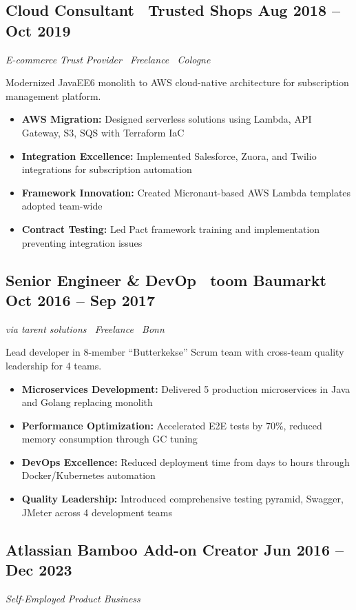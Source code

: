 \documentclass[10pt,a4paper]{article}
\begin{document}
\subsection{Cloud Consultant \textbar\ Trusted Shops \hfill Aug 2018 -- Oct 2019}
\textit{E-commerce Trust Provider \textbar\ Freelance \textbar\ Cologne}

Modernized JavaEE6 monolith to AWS cloud-native architecture for subscription management platform.
\begin{itemize}
\item \textbf{AWS Migration:} Designed serverless solutions using Lambda, API Gateway, S3, SQS with Terraform IaC
\item \textbf{Integration Excellence:} Implemented Salesforce, Zuora, and Twilio integrations for subscription automation
\item \textbf{Framework Innovation:} Created Micronaut-based AWS Lambda templates adopted team-wide
\item \textbf{Contract Testing:} Led Pact framework training and implementation preventing integration issues
\end{itemize}

\vfill

\newpage

\subsection{Senior Engineer \& DevOp \textbar\ toom Baumarkt \hfill Oct 2016 -- Sep 2017}
\textit{via tarent solutions \textbar\ Freelance \textbar\ Bonn}

Lead developer in 8-member ``Butterkekse'' Scrum team with cross-team quality leadership for 4 teams.
\begin{itemize}
\item \textbf{Microservices Development:} Delivered 5 production microservices in Java and Golang replacing monolith
\item \textbf{Performance Optimization:} Accelerated E2E tests by 70\%, reduced memory consumption through GC tuning
\item \textbf{DevOps Excellence:} Reduced deployment time from days to hours through Docker/Kubernetes automation
\item \textbf{Quality Leadership:} Introduced comprehensive testing pyramid, Swagger, JMeter across 4 development teams
\end{itemize}

\subsection{Atlassian Bamboo Add-on Creator \hfill Jun 2016 -- Dec 2023}
\textit{Self-Employed Product Business}
\end{document}

